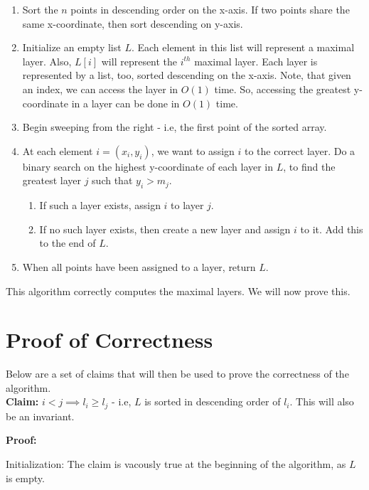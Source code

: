 \documentclass[a4paper]{article}
\begin{document}
\begin{enumerate}
    \item Sort the $n$ points in descending order on the x-axis. If two points share the same x-coordinate, then sort descending on y-axis.
    \item Initialize an empty list $L$. Each element in this list will represent a maximal layer. Also, $L[i]$ will represent the $i^{th}$ maximal layer. Each layer is represented by a list, too, sorted descending on the x-axis. Note, that given an index, we can access the layer in $O(1)$ time. So, accessing the greatest y-coordinate in a layer can be done in $O(1)$ time.
    \item Begin sweeping from the right - i.e, the first point of the sorted array.
    \item At each element $i = (x_i, y_i)$, we want to assign $i$ to the correct layer. Do a binary search on the highest y-coordinate of each layer in $L$, to find the greatest layer $j$ such that $y_i > m_j$.
    
    \begin{enumerate}
        \item If such a layer exists, assign $i$ to layer $j$. 
        \item If no such layer exists, then create a new layer and assign $i$ to it. Add this to the end of $L$.
    \end{enumerate}

    \item When all points have been assigned to a layer, return $L$.
\end{enumerate}

This algorithm correctly computes the maximal layers. We will now prove this.

\section*{Proof of Correctness}

Below are a set of claims that will then be used to prove the correctness of the algorithm.\\

\textbf{Claim:} $i < j \implies l_i \geq l_j$ - i.e, $L$ is sorted in descending order of $l_i$. This will also be an invariant.

\textbf{Proof:}

Initialization: The claim is vacously true at the beginning of the algorithm, as $L$ is empty.\\
\end{document}
